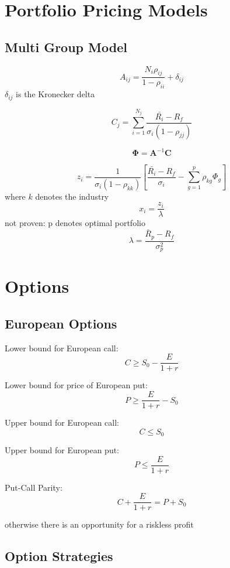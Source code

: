 \documentclass[]{amsart}
\newcommand{\p}[1]{\left(#1\right)}
\newcommand{\bs}[1]{\boldsymbol{#1}}
\begin{document}
\section{Portfolio Pricing Models}
\subsection{Multi Group Model}

	
$$ A_{ij} = \frac{N_i \rho_{ij}}{1-\rho_{ii}} + \delta_{ij} $$ 
$\delta_{ij}$ is the Kronecker delta 

$$ C_{j} = \sum_{i=1}^{N_j} \frac{\bar{R_i}-R_f}{\sigma_i \p{1-\rho_{jj}}} $$

$$ \bs{\Phi} = \bs{A}^{-1}\bs{C} $$

$$ z_i = \frac{1}{\sigma_i \p{1-\rho_{kk}}} \left[ \frac{\bar{R_i}-R_f}{\sigma_i} - \sum_{g=1}^p \rho_{kg} \Phi_g \right] $$ 
where $k$ denotes the industry 
$$ x_i = \frac{z_i}{\lambda} $$ 
not proven: p denotes optimal portfolio 
$$ \lambda = \frac{\bar{R}_p-R_f}{\sigma_p^2} $$ 





\section{Options}
\subsection{European Options}
Lower bound for European call:
$$ C \geq S_0 - \frac{E}{1+r} $$ 

Lower bound for price of European put: 
$$ P \geq \frac{E}{1+r} - S_0 $$ 


Upper bound for European call:
$$ C \leq S_0 $$ 

Upper bound for European put: 
$$ P \leq \frac{E}{1+r} $$ 

Put-Call Parity:
$$ C + \frac{E}{1+r} = P + S_0 $$ 

otherwise there is an opportunity for a riskless profit 

\subsection{Option Strategies}
\end{document}
